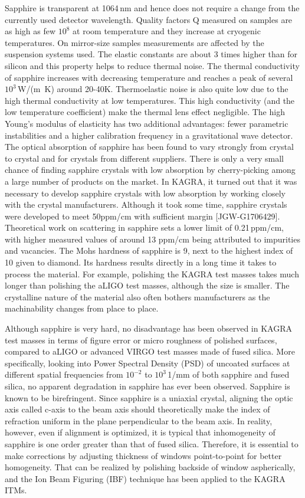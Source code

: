Sapphire is transparent at 1064\,nm and hence does not require a change from the currently used detector wavelength. Quality factors Q measured on samples are as high as few $10^8$ at room temperature and they increase at cryogenic temperatures. On mirror-size samples measurements are affected by the suspension systems used. The elastic constants are about 3 times higher than for silicon and this property helps to reduce thermal noise. The thermal conductivity of sapphire increases with decreasing temperature and reaches a peak of several $10^3$\,W/(m \,K) around 20-40K.  Thermoelastic noise is also quite low due to the high thermal conductivity at low temperatures.  This high conductivity (and the low temperature coefficient) make the thermal lens effect negligible. The high Young's modulus of elasticity has two additional advantages: fewer parametric instabilities and a higher calibration frequency in a gravitational wave detector.
The optical absorption of sapphire has been found to vary strongly from crystal to crystal and for crystals from different suppliers. There is only a very small chance of finding sapphire crystals with low absorption by cherry-picking among a large number of products on the market. In KAGRA, it turned out that it was necessary to develop sapphire crystals with low absorption by working closely with the crystal manufacturers. Although it took some time, sapphire crystals were developed to meet 50ppm/cm with sufficient margin [JGW-G1706429]. 
Theoretical work on scattering in sapphire sets a lower limit of 0.21\,ppm/cm, with higher measured values of around 13 ppm/cm being attributed to impurities and vacancies.
The Mohs hardness of sapphire is 9, next to the highest index of 10 given to diamond.  Its hardness results directly in a long time it takes to process the material. For example, polishing the KAGRA test masses takes much longer than polishing the aLIGO test masses, although the size is smaller. The crystalline nature of the material also often bothers manufacturers as the machinability changes from place to place.

Although sapphire is very hard, no disadvantage has been observed in KAGRA test masses in terms of figure error or micro roughness of polished surfaces, compared to aLIGO or advanced VIRGO test masses made of fused silica.  More specifically, looking into Power Spectral Density (PSD) of uncoated surfaces at different spatial frequencies from $10^{-2}$ to $10^3$\,1/mm of both sapphire and fused silica,  no apparent degradation in sapphire has ever been observed.
Sapphire is known to be birefringent. Since sapphire is a uniaxial crystal, aligning the optic axis called c-axis to the beam axis should theoretically make the index of refraction uniform in the plane perpendicular to the beam axis. In reality, however, even if alignment is optimized, it is typical that inhomogeneity of sapphire is one order greater than that of fused silica. Therefore, it is essential to make corrections by adjusting thickness of windows point-to-point for better homogeneity. That can be realized by polishing backside of window aspherically, and the Ion Beam Figuring (IBF) technique has been applied to the KAGRA ITMs.

